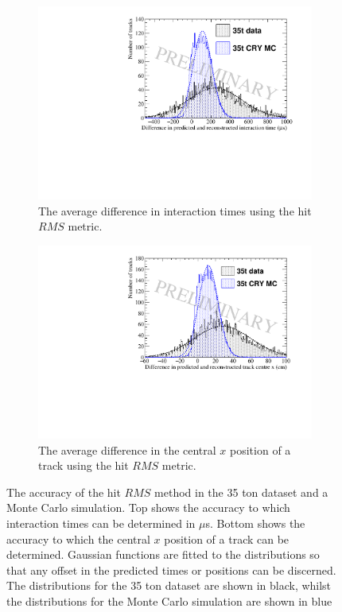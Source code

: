 \begin{figure}
  \centering
  \begin{subfigure}{0.6\textwidth}
    \centering
    \includegraphics[width=\textwidth]{Overlay_AvTimeDiff_RMS}
    \caption{The average difference in interaction times using the hit $RMS$ metric.}
    \label{fig:DiffOverlayAvDiff_RMS_T}
  \end{subfigure}

  \begin{subfigure}{0.6\textwidth}
    \centering
    \includegraphics[width=\textwidth]{Overlay_AvXPosDiff_RMS}
    \caption{The average difference in the central $x$ position of a track using the hit $RMS$ metric.}
    \label{fig:DiffOverlayAvDiff_RMS_X}
  \end{subfigure}
  \caption[Comparing the accuracy of the hit $RMS$ method in the 35 ton dataset and a Monte Carlo simulation]
          {The accuracy of the hit $RMS$ method in the 35 ton dataset and a Monte Carlo simulation. Top shows the accuracy to which interaction times can be determined in $\mu$s. Bottom shows the accuracy to which the central $x$ position of a track can be determined. Gaussian functions are fitted to the distributions so that any offset in the predicted times or positions can be discerned. The distributions for the 35 ton dataset are shown in black, whilst the distributions for the Monte Carlo simulation are shown in blue}
  \label{fig:DiffOverlayAvDiff_RMS}
\end{figure}

